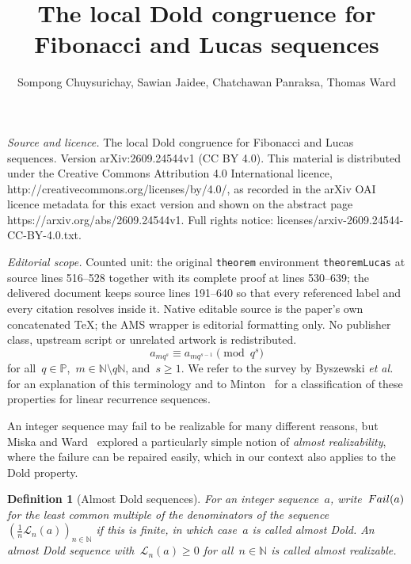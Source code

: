 \documentclass[10pt,a4paper]{amsart}
\numberwithin{equation}{section} %
\newtheorem{definition}[thm]{Definition}
\numberwithin{table}{section} %
\numberwithin{figure}{section}
\def\NN{\mathbb{N}}
\def\PP{\mathbb{P}}
\newcommand\failure{{\rm{Fail}}}
\newcommand\least{{\mathcal{L}}}
\def\ge{\geqslant}
\begin{document}
\title[The local Dold congruence for Fibonacci and Lucas sequences]{The local Dold congruence for Fibonacci and Lucas sequences}
\author{Sompong Chuysurichay, Sawian Jaidee, Chatchawan Panraksa, Thomas Ward}
\date{}
\maketitle
\noindent\emph{Source and licence.} The local Dold congruence for Fibonacci and Lucas sequences. Version arXiv:2609.24544v1 (CC BY 4.0). This material is distributed under the Creative Commons Attribution 4.0 International licence, http://creativecommons.org/licenses/by/4.0/, as recorded in the arXiv OAI licence metadata for this exact version and shown on the abstract page https://arxiv.org/abs/2609.24544v1. Full rights notice: licenses/arxiv-2609.24544-CC-BY-4.0.txt.\par\smallskip
\noindent\textit{Editorial scope.} Counted unit: the original \texttt{theorem} environment \texttt{theoremLucas} at source lines 516--528 together with its complete proof at lines 530--639; the delivered document keeps source lines 191--640 so that every referenced label and every citation resolves inside it. Native editable source is the paper's own concatenated TeX; the AMS wrapper is editorial formatting only. No publisher class, upstream script or unrelated artwork is redistributed.
\begin{equation}\label{equationDoldForIntegerSequence2}
a_{mq^s}
\equiv
a_{mq^{s-1}}
\pmod{q^s}
\end{equation}
for all~$q\in\PP$,~$m\in\NN\setminus q\mathbb{N}$, and~$s\ge1$.
We refer to the survey by Byszewski {\it{et al.}}~\cite{MR4332826}
for an explanation of this terminology
and to Minton~\cite{MR3195758} for a classification of
these properties for linear recurrence sequences.

An integer sequence may fail to be realizable for
many different reasons, but Miska and Ward~\cite{MR4361581}
explored
a particularly simple notion of \emph{almost realizability},
where the failure can be repaired easily,
which in our context also applies to the Dold property.

\begin{definition}[Almost Dold sequences]\label{definitionAlmostDold}
For an integer sequence~$a$,
write~$\failure(a)$
for the least common multiple of
the denominators of the sequence~$(\frac{1}{n}\least_n(a))_{n\in\NN}$
if this is finite, in which case~$a$
is called \emph{almost Dold}.
An almost Dold sequence with~$\least_n(a)\ge0$
for all~$n\in\NN$ is called \emph{almost realizable}.
\end{definition}
\end{document}
